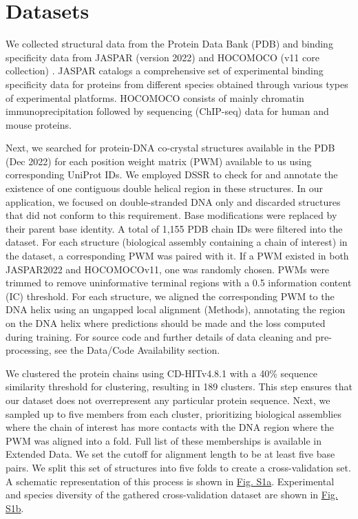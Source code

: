 \section{Datasets}
We collected structural data from the Protein Data Bank (PDB) \citep{Berman2000} and binding specificity data from JASPAR (version 2022) \citep{Jaime2022}  and HOCOMOCO (v11 core collection) \citep{kulakovskiy2018hocomoco}. JASPAR catalogs a comprehensive set of experimental binding specificity data for proteins from different species obtained through various types of experimental platforms. HOCOMOCO consists of mainly chromatin immunoprecipitation followed by sequencing (ChIP-seq) \citep{Park2009} data for human and mouse proteins.
\par
Next, we searched for protein-DNA co-crystal structures available in the PDB (Dec 2022) for each position weight matrix (PWM) available to us using corresponding UniProt IDs. We employed DSSR \citep{lu2015dssr} to check for and annotate the existence of one contiguous double helical region in these structures. In our application, we focused on double-stranded DNA only and discarded structures that did not conform to this requirement. Base modifications were replaced by their parent base identity. A total of 1,155 PDB chain IDs were filtered into the dataset. For each structure (biological assembly containing a chain of interest) in the dataset, a corresponding PWM was paired with it. If a PWM existed in both JASPAR2022 and HOCOMOCOv11, one was randomly chosen. PWMs were trimmed to remove uninformative terminal regions with a 0.5 information content (IC) threshold. For each structure, we aligned the corresponding PWM to the DNA helix using an ungapped local alignment (Methods), annotating the region on the DNA helix where predictions should be made and the loss computed during training. For source code and further details of data cleaning and pre-processing, see the Data/Code Availability section.
\par
We clustered the protein chains using CD-HITv4.8.1 \citep{fu2012cd} with a 40\% sequence similarity threshold for clustering, resulting in 189 clusters. This step ensures that our dataset does not overrepresent any particular protein sequence. Next, we sampled up to five members from each cluster, prioritizing biological assemblies where the chain of interest has more contacts with the DNA region where the PWM was aligned into a fold. Full list of these memberships is available in Extended Data. We set the cutoff for alignment length to be at least five base pairs. We split this set of structures into five folds to create a cross-validation set. A schematic representation of this process is shown in \hyperref[fig:pdnaS1]{Fig. S1a}. Experimental and species diversity of the gathered cross-validation dataset are shown in \hyperref[fig:pdnaS1]{Fig. S1b}.
